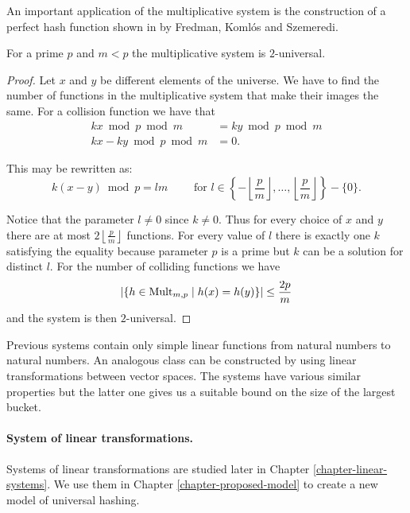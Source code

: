 An important application of the multiplicative system is the construction of a perfect hash function shown in \cite{1884} by Fredman, Koml\'os and Szemeredi.

\begin{remark}
For a prime $p$ and $m < p$ the multiplicative system is $2$-universal.
\end{remark}
\begin{proof}
Let $x$ and $y$ be different elements of the universe. We have to find the number of functions in the multiplicative system that make their images the same. For a collision function we have that
\begin{displaymath}
\begin{split}
kx \bmod p \bmod m & = ky \bmod p \bmod m \\
kx - ky \bmod p \bmod m & = 0 \text{.}
\end{split}
\end{displaymath}

This may be rewritten as:
\begin{displaymath}
k(x - y) \bmod p = l m \qquad \text{ for  } l \in \left\lbrace -\left\lfloor\frac{p}{m}\right\rfloor, \dots, \left\lfloor\frac{p}{m}\right\rfloor \right\rbrace - \{0\} \text{.}
\end{displaymath}

Notice that the parameter $l \neq 0$ since $k \neq 0$. Thus for every choice of $x$ and $y$ there are at most $2\left\lfloor\frac{p}{m}\right\rfloor$ functions. For every value of $l$ there is exactly one $k$ satisfying the equality because parameter $p$ is a prime but $k$ can be a solution for distinct $l$. For the number of colliding functions we have \[ | \lbrace h \in \mathrm{Mult}_{m,p} \mid h(x) = h(y) \rbrace | \leq \frac{2p}{m} \] and the system is then $2$-universal.
\end{proof}

Previous systems contain only simple linear functions from natural numbers to natural numbers. An analogous class can be constructed by using linear transformations between vector spaces. The systems have various similar properties but the latter one gives us a suitable bound on the size of the largest bucket.

\paragraph{System of linear transformations.} 
Systems of linear transformations are studied later in Chapter \ref{chapter-linear-systems}. We use them in Chapter \ref{chapter-proposed-model} to create a new model of universal hashing.

